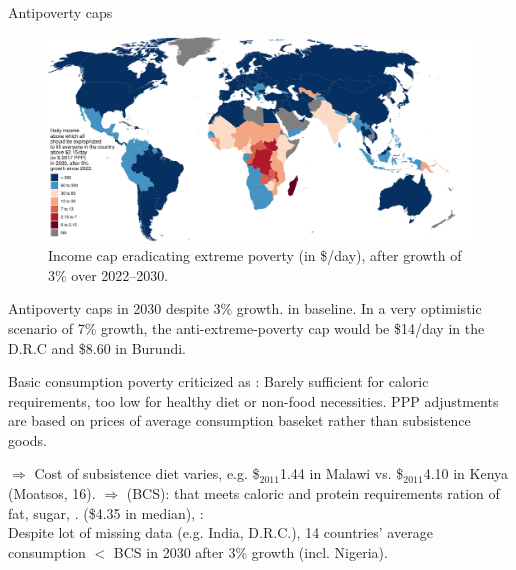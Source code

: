 \documentclass[aspectratio=169,xcolor=dvipsnames, 11pt,mathserif]{beamer}
\begin{document}
\begin{frame}{Antipoverty caps}
    \begin{figure}
        \caption{Income cap eradicating extreme poverty (in \$/day), after growth of 3\% over 2022--2030. 
        }
        \includegraphics[height=.85\textheight]{../figures/y_expropriated_2_average.pdf}
      \end{figure} 
\end{frame}

\begin{frame}{Antipoverty caps}   
    \bbsp 
    \ip {} in 2030 despite 3\% growth.
    \ip {} in baseline.
    \ip In a very optimistic scenario of 7\% growth, the anti-extreme-poverty cap would be \$14/day in the D.R.C and \$8.60 in Burundi.
    \ee 
\end{frame}

\begin{frame}{Basic consumption poverty}   
    \bbsp 
    \ip {} criticized as :
    \bbsp \ip Barely sufficient for caloric requirements, too low for healthy diet or non-food necessities.
    \ip PPP adjustments are based on prices of average consumption baseket rather than subsistence goods. 
   
    \ee 
    \ip  $\Rightarrow$ Cost of subsistence diet varies, e.g. \$$_\text{2011}$1.44 in Malawi vs. \$$_\text{2011}$4.10 in Kenya (Moatsos, 16).
    \ip $\Rightarrow$  (BCS):  that meets caloric and protein requirements  ration of fat, sugar, .
    \ip {} (\$4.35 in median), : 
    \\ Despite lot of missing data (e.g. India, D.R.C.), 14 countries' average consumption $<$ BCS in 2030 after 3\% growth (incl. Nigeria).
    \ee 
\end{frame}
\end{document}
